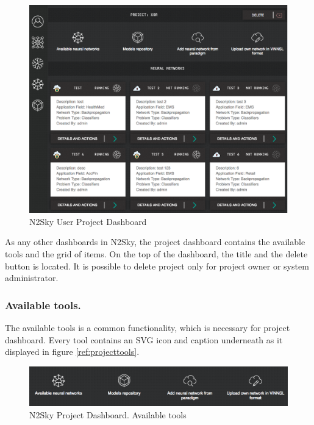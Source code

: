 \begin{figure}[H]
\begin{center}
  \includegraphics[width=\linewidth]{components/5/img/projects_dsahboard.png}
  \caption{N2Sky User Project Dashboard}
  \label{fig:projects_dsahboard}
\end{center}
\end{figure}

As any other dashboards in N2Sky, the project dashboard contains the available tools and the grid of items.
On the top of the dashboard, the title and the delete button is located. It is possible to delete project only for project owner or system administrator. 

\subsubsection{Available tools.} 

The available tools is a common functionality, which is necessary for project dashboard. Every tool contains an SVG icon and caption underneath as it displayed in figure \ref{ref:projecttools}. 

\begin{figure}[htbp]
\begin{center}
  \includegraphics[width=\linewidth]{components/5/img/project_tools.png}
  \caption{N2Sky Project Dashboard. Available tools}
  \label{fig:projecttools}
\end{center}
\end{figure}

